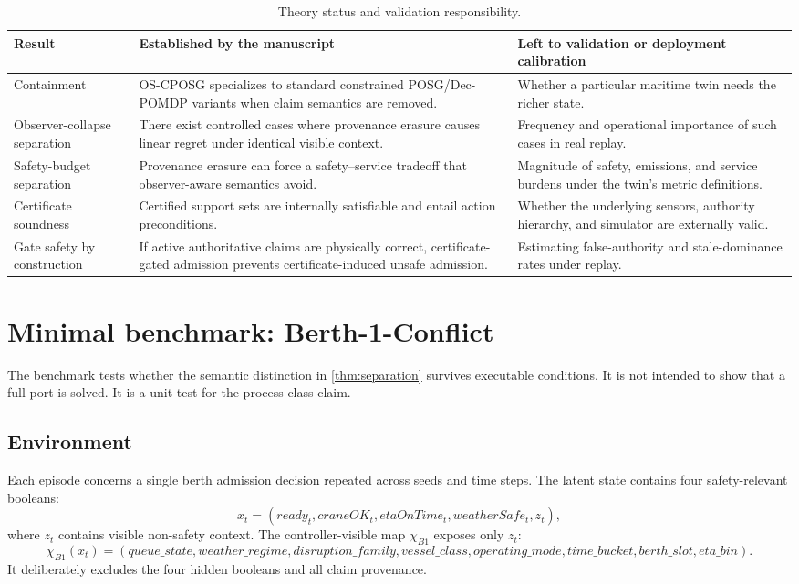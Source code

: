 \documentclass[11pt]{article}
\newcommand{\OSCPOSG}{\mbox{\normalfont\textsc{OS-CPOSG}}}
\newcommand{\1}{\mathbf{1}}
\theoremstyle{definition}
\theoremstyle{plain}
\theoremstyle{remark}
\begin{document}
\begin{table}[H]
\centering
\caption{Theory status and validation responsibility.}
\label{tab:theory-status}
\small
\begin{tabularx}{\textwidth}{@{}L{0.22\textwidth}Y Y@{}}
\toprule
Result & Established by the manuscript & Left to validation or deployment calibration \\
\midrule
Containment & \OSCPOSG{} specializes to standard constrained POSG/Dec-POMDP variants when claim semantics are removed. & Whether a particular maritime twin needs the richer state. \\
Observer-collapse separation & There exist controlled cases where provenance erasure causes linear regret under identical visible context. & Frequency and operational importance of such cases in real replay. \\
Safety-budget separation & Provenance erasure can force a safety--service tradeoff that observer-aware semantics avoid. & Magnitude of safety, emissions, and service burdens under the twin's metric definitions. \\
Certificate soundness & Certified support sets are internally satisfiable and entail action preconditions. & Whether the underlying sensors, authority hierarchy, and simulator are externally valid. \\
Gate safety by construction & If active authoritative claims are physically correct, certificate-gated admission prevents certificate-induced unsafe admission. & Estimating false-authority and stale-dominance rates under replay. \\
\bottomrule
\end{tabularx}
\end{table}

\section{Minimal benchmark: Berth-1-Conflict}
\label{sec:benchmark}

The benchmark tests whether the semantic distinction in \cref{thm:separation} survives executable conditions. It is not intended to show that a full port is solved. It is a unit test for the process-class claim.

\subsection{Environment}

Each episode concerns a single berth admission decision repeated across seeds and time steps. The latent state contains four safety-relevant booleans:
\[
x_t=(ready_t, craneOK_t, etaOnTime_t, weatherSafe_t, z_t),
\]
where $z_t$ contains visible non-safety context. The controller-visible map $\chi_{B1}$ exposes only $z_t$:
\[
\chi_{B1}(x_t)=
(queue\_state, weather\_regime, disruption\_family, vessel\_class, operating\_mode, time\_bucket, berth\_slot, eta\_bin).
\]
It deliberately excludes the four hidden booleans and all claim provenance.
\end{document}
